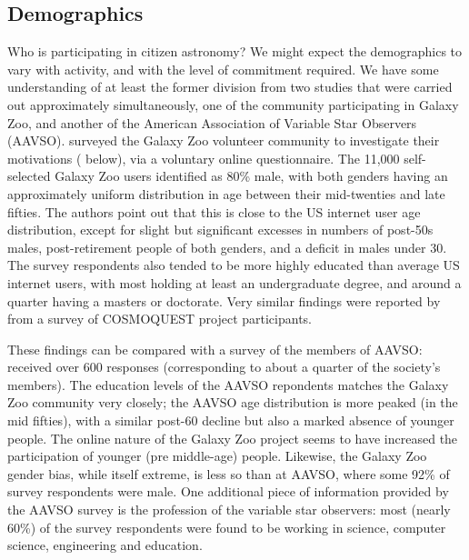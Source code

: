 \documentclass{ar2e}
\begin{document}
\subsection{Demographics}
\label{sec:crowd:demographics}

Who is participating in citizen astronomy? We might expect the demographics to
vary with activity, and with the level of commitment required. We have some
understanding of at least the former division from two studies that were
carried out approximately simultaneously, one of the community  participating
in Galaxy Zoo, and another of the American Association of Variable Star
Observers (AAVSO).  \citet{Rad++2013} surveyed the Galaxy Zoo volunteer
community to investigate their motivations (
below), via a voluntary online questionnaire. The 11,000 self-selected Galaxy
Zoo users identified as 80\% male, with both genders having an approximately
uniform distribution in age between their mid-twenties and late fifties. The
authors point out that this is close to the US internet user age distribution,
except for slight but significant excesses in numbers of post-50s males,
post-retirement people of both genders, and a deficit in males under 30. The
survey respondents  also tended to be more highly educated than average US
internet users, with most holding at least an undergraduate degree, and around
a quarter having a masters or doctorate. Very similar findings were reported
by \citet{COSMOQUESTsurvey} from a survey of COSMOQUEST project participants.

These findings can be compared with a survey of the members of AAVSO:
\citet{P+P2012} received over 600 responses (corresponding to about a quarter
of the society's members). The education levels of
the AAVSO repondents matches the Galaxy Zoo community very closely; the AAVSO
age distribution is more peaked (in the mid fifties), with a similar post-60
decline but also a marked absence of younger people. The online nature of the
Galaxy Zoo project seems to have increased the participation of younger (pre
middle-age) people. Likewise, the Galaxy Zoo gender bias, while itself
extreme, is less so than at AAVSO, where some 92\% of survey respondents were
male. One additional piece of information provided by the AAVSO survey is the
profession of the variable star observers: most (nearly 60\%) of the survey
respondents were found to be working in science, computer science, engineering
and education. 
\end{document}
